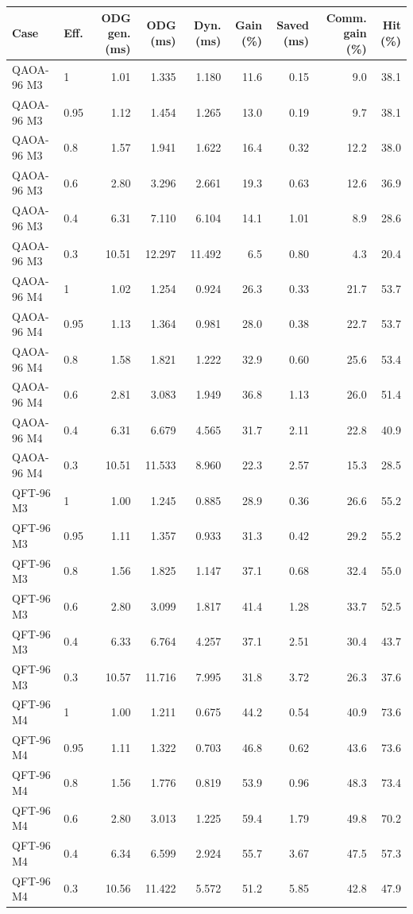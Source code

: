 \begin{tabular}{llrrrrrrr}
\toprule
Case & Eff. & ODG gen. (ms) & ODG (ms) & Dyn. (ms) & Gain (\%) & Saved (ms) & Comm. gain (\%) & Hit (\%) \\
\midrule
QAOA-96 M3 & 1 & 1.01 & 1.335 & 1.180 & 11.6 & 0.15 & 9.0 & 38.1 \\
QAOA-96 M3 & 0.95 & 1.12 & 1.454 & 1.265 & 13.0 & 0.19 & 9.7 & 38.1 \\
QAOA-96 M3 & 0.8 & 1.57 & 1.941 & 1.622 & 16.4 & 0.32 & 12.2 & 38.0 \\
QAOA-96 M3 & 0.6 & 2.80 & 3.296 & 2.661 & 19.3 & 0.63 & 12.6 & 36.9 \\
QAOA-96 M3 & 0.4 & 6.31 & 7.110 & 6.104 & 14.1 & 1.01 & 8.9 & 28.6 \\
QAOA-96 M3 & 0.3 & 10.51 & 12.297 & 11.492 & 6.5 & 0.80 & 4.3 & 20.4 \\
QAOA-96 M4 & 1 & 1.02 & 1.254 & 0.924 & 26.3 & 0.33 & 21.7 & 53.7 \\
QAOA-96 M4 & 0.95 & 1.13 & 1.364 & 0.981 & 28.0 & 0.38 & 22.7 & 53.7 \\
QAOA-96 M4 & 0.8 & 1.58 & 1.821 & 1.222 & 32.9 & 0.60 & 25.6 & 53.4 \\
QAOA-96 M4 & 0.6 & 2.81 & 3.083 & 1.949 & 36.8 & 1.13 & 26.0 & 51.4 \\
QAOA-96 M4 & 0.4 & 6.31 & 6.679 & 4.565 & 31.7 & 2.11 & 22.8 & 40.9 \\
QAOA-96 M4 & 0.3 & 10.51 & 11.533 & 8.960 & 22.3 & 2.57 & 15.3 & 28.5 \\
QFT-96 M3 & 1 & 1.00 & 1.245 & 0.885 & 28.9 & 0.36 & 26.6 & 55.2 \\
QFT-96 M3 & 0.95 & 1.11 & 1.357 & 0.933 & 31.3 & 0.42 & 29.2 & 55.2 \\
QFT-96 M3 & 0.8 & 1.56 & 1.825 & 1.147 & 37.1 & 0.68 & 32.4 & 55.0 \\
QFT-96 M3 & 0.6 & 2.80 & 3.099 & 1.817 & 41.4 & 1.28 & 33.7 & 52.5 \\
QFT-96 M3 & 0.4 & 6.33 & 6.764 & 4.257 & 37.1 & 2.51 & 30.4 & 43.7 \\
QFT-96 M3 & 0.3 & 10.57 & 11.716 & 7.995 & 31.8 & 3.72 & 26.3 & 37.6 \\
QFT-96 M4 & 1 & 1.00 & 1.211 & 0.675 & 44.2 & 0.54 & 40.9 & 73.6 \\
QFT-96 M4 & 0.95 & 1.11 & 1.322 & 0.703 & 46.8 & 0.62 & 43.6 & 73.6 \\
QFT-96 M4 & 0.8 & 1.56 & 1.776 & 0.819 & 53.9 & 0.96 & 48.3 & 73.4 \\
QFT-96 M4 & 0.6 & 2.80 & 3.013 & 1.225 & 59.4 & 1.79 & 49.8 & 70.2 \\
QFT-96 M4 & 0.4 & 6.34 & 6.599 & 2.924 & 55.7 & 3.67 & 47.5 & 57.3 \\
QFT-96 M4 & 0.3 & 10.56 & 11.422 & 5.572 & 51.2 & 5.85 & 42.8 & 47.9 \\
\bottomrule
\end{tabular}
